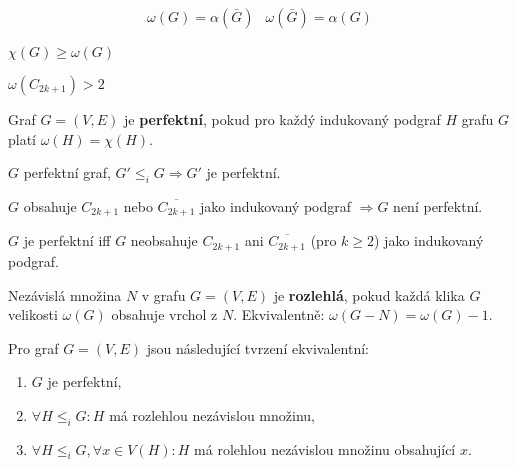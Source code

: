 \begin{pozor}
	$$
	\begin{array}{cc}
		\omega (G) = \alpha (\bar{G}) & \omega(\bar{G}) = \alpha(G)
	\end{array}
	$$
\end{pozor}

\begin{pozor}
	$\chi(G) \geq \omega(G)$
\end{pozor}

\begin{pozor}
	$\omega(C_{2k+1}) > 2$
\end{pozor}

\begin{definice}
	Graf $G = (V,E)$ je \textbf{perfektní}, pokud pro každý indukovaný podgraf $H$ grafu $G$ platí $\omega(H) = \chi(H)$.
\end{definice}

\begin{pozor}
	$G$ perfektní graf, $G' \leq_{i} G \Rightarrow G'$ je perfektní.
\end{pozor}

\begin{dusl}
	$G$ obsahuje $C_{2k+1}$ nebo $\overline{C_{2k+1}}$ jako indukovaný podgraf $\Rightarrow G$ není perfektní.
\end{dusl}

\begin{veta}
	$G$ je perfektní iff $G$ neobsahuje $C_{2k+1}$ ani $\overline{C_{2k+1}}$ (pro $k \geq 2$) jako indukovaný podgraf.
\end{veta}

\begin{definice}
	Nezávislá množina $N$ v grafu $G = (V,E)$ je \textbf{rozlehlá}, pokud každá klika $G$ velikosti $\omega(G)$ obsahuje vrchol z $N$. Ekvivalentně: $\omega(G-N) = \omega(G)-1$.
\end{definice}

\begin{lemma}[1]
	Pro graf $G = (V,E)$ jsou následující tvrzení ekvivalentní:
	
	\begin{enumerate}
		\item $G$ je perfektní,
		\item $\forall H \leq_{i} G: H$ má rozlehlou nezávislou množinu,
		\item $\forall H \leq_{i} G, \forall x \in V(H):H$ má rolehlou nezávislou množinu obsahující $x$.
	\end{enumerate}
\end{lemma}

